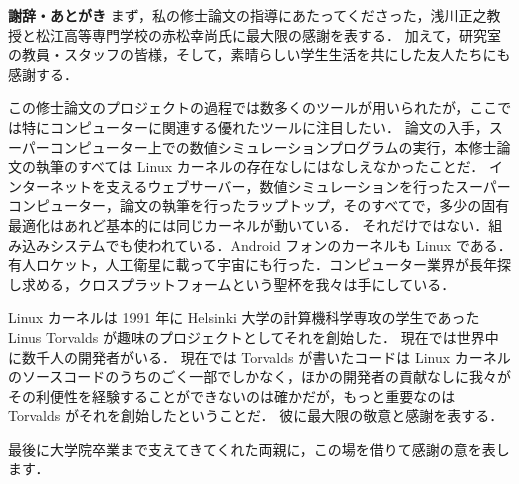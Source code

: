 \documentclass[dvipdfmx, a4paper]{jarticle}
\numberwithin{equation}{section}
\begin{document}
\newpage
\noindent
\textbf{謝辞・あとがき} \quad まず，私の修士論文の指導にあたってくださった，浅川正之教授と松江高等専門学校の赤松幸尚氏に最大限の感謝を表する．
加えて，研究室の教員・スタッフの皆様，そして，素晴らしい学生生活を共にした友人たちにも感謝する．

この修士論文のプロジェクトの過程では数多くのツールが用いられたが，ここでは特にコンピューターに関連する優れたツールに注目したい．
論文の入手，スーパーコンピューター上での数値シミュレーションプログラムの実行，本修士論文の執筆のすべては Linux カーネルの存在なしにはなしえなかったことだ．
インターネットを支えるウェブサーバー，数値シミュレーションを行ったスーパーコンピューター，論文の執筆を行ったラップトップ，そのすべてで，多少の固有最適化はあれど基本的には同じカーネルが動いている．
それだけではない．組み込みシステムでも使われている．Android フォンのカーネルも Linux である．有人ロケット，人工衛星に載って宇宙にも行った．コンピューター業界が長年探し求める，クロスプラットフォームという聖杯を我々は手にしている．

Linux カーネルは 1991 年に Helsinki 大学の計算機科学専攻の学生であった Linus Torvalds が趣味のプロジェクトとしてそれを創始した．
現在では世界中に数千人の開発者がいる．
現在では Torvalds が書いたコードは Linux カーネルのソースコードのうちのごく一部でしかなく，ほかの開発者の貢献なしに我々がその利便性を経験することができないのは確かだが，もっと重要なのは Torvalds がそれを創始したということだ．
彼に最大限の敬意と感謝を表する．

最後に大学院卒業まで支えてきてくれた両親に，この場を借りて感謝の意を表します．
\end{document}
